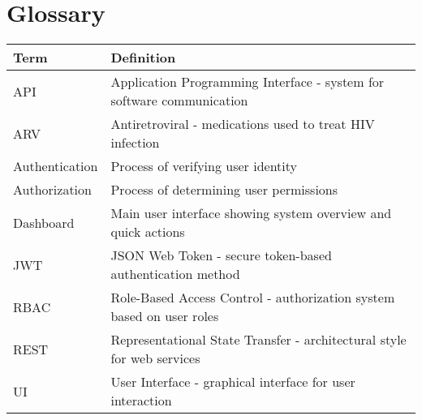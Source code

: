 \documentclass[12pt,a4paper]{article}
\begin{document}
\section{Glossary}

\begin{longtable}{|p{3cm}|p{11cm}|}
\hline
\textbf{Term} & \textbf{Definition} \\
\hline
API & Application Programming Interface - system for software communication \\
\hline
ARV & Antiretroviral - medications used to treat HIV infection \\
\hline
Authentication & Process of verifying user identity \\
\hline
Authorization & Process of determining user permissions \\
\hline
Dashboard & Main user interface showing system overview and quick actions \\
\hline
JWT & JSON Web Token - secure token-based authentication method \\
\hline
RBAC & Role-Based Access Control - authorization system based on user roles \\
\hline
REST & Representational State Transfer - architectural style for web services \\
\hline
UI & User Interface - graphical interface for user interaction \\
\hline
\end{longtable}
\end{document}

